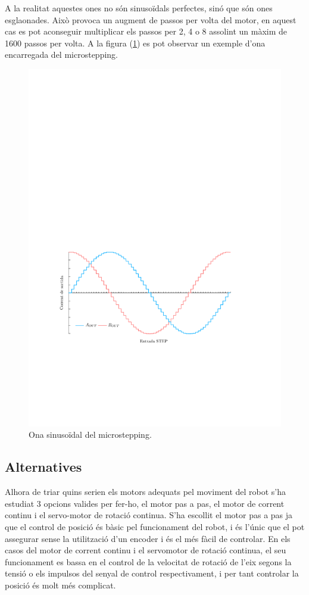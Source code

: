 \begin{itemize}
		A la realitat aquestes ones no són sinusoïdals perfectes, sinó que són ones esglaonades. Això provoca un augment de passos per volta del motor, en aquest cas es pot aconseguir multiplicar els passos per 2, 4 o 8 assolint un màxim de 1600 passos per volta. A la figura (\ref{fig:Microstepping}) es pot observar un exemple d’ona encarregada del microstepping. 
		
		\begin{figure}[H]
			\centering
			\includegraphics{Multistepper-grafic}
			\caption{Ona sinusoïdal del microstepping.}
			\label{fig:Microstepping}
		\end{figure}
\end{itemize}

\subsection{Alternatives}
Alhora de triar quins serien els motors adequats pel moviment del robot s'ha estudiat 3 opcions valides per fer-ho, el motor pas a pas, el motor de corrent continu i el servo-motor de rotació continua. S'ha escollit el motor pas a pas ja que el control de posició és bàsic pel funcionament del robot, i és l'únic que el pot assegurar sense la utilització d'un encoder i és el més fàcil de controlar. En els casos del motor de corrent continu i el servomotor de rotació continua, el seu funcionament es bassa en el control de la velocitat de rotació de l'eix segons la tensió o els impulsos del senyal de control respectivament, i per tant controlar la posició és molt més complicat. 


